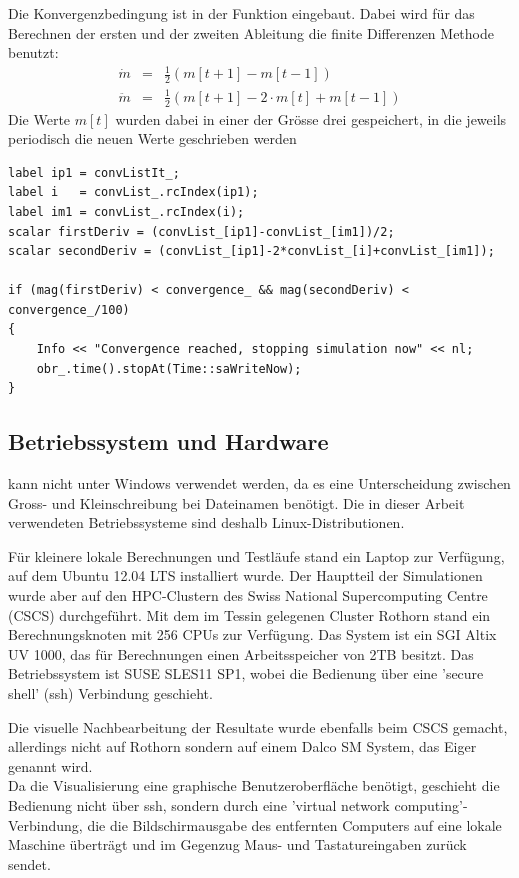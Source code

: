 Die Konvergenzbedingung ist in der Funktion  eingebaut.
Dabei wird für das Berechnen der ersten und der zweiten Ableitung die finite Differenzen Methode benutzt:
%
\begin{eqnarray}
    \label{eq:torqueCalc:fd}
    \dot{m} & = & \frac{1}{2}\left(  m[t+1] - m[t-1] \right) \\
    \ddot{m} & = & \frac{1}{2}\left(  m[t+1] - 2 \cdot m[t] + m[t-1] \right) 
\end{eqnarray}
%
Die Werte $m[t]$ wurden dabei in einer  der Grösse drei gespeichert, in die jeweils periodisch die neuen Werte geschrieben werden
%
\begin{lstlisting}
label ip1 = convListIt_;
label i   = convList_.rcIndex(ip1);
label im1 = convList_.rcIndex(i);
scalar firstDeriv = (convList_[ip1]-convList_[im1])/2;
scalar secondDeriv = (convList_[ip1]-2*convList_[i]+convList_[im1]);

if (mag(firstDeriv) < convergence_ && mag(secondDeriv) < convergence_/100)
{
    Info << "Convergence reached, stopping simulation now" << nl;
    obr_.time().stopAt(Time::saWriteNow);
}
\end{lstlisting}
%
%

%
\subsection{Betriebssystem und Hardware}
\label{Kapitel:Hardware}
\openfoam{} kann nicht unter Windows verwendet werden, da es eine Unterscheidung zwischen Gross- und Kleinschreibung bei Dateinamen benötigt. Die in dieser Arbeit verwendeten Betriebssysteme sind deshalb Linux-Distributionen.

Für kleinere lokale Berechnungen und Testläufe stand ein Laptop zur Verfügung, auf dem Ubuntu 12.04 LTS installiert wurde.
Der Hauptteil der Simulationen wurde aber auf den HPC-Clustern des Swiss National Supercomputing Centre (CSCS) durchgeführt.
Mit dem im Tessin gelegenen Cluster Rothorn stand ein Berechnungsknoten mit 256 CPUs zur Verfügung. Das System ist ein SGI Altix UV 1000, das für Berechnungen einen Arbeitsspeicher von 2TB besitzt.
Das Betriebssystem ist SUSE SLES11 SP1, wobei die Bedienung über eine 'secure shell' (ssh) Verbindung geschieht.

Die visuelle Nachbearbeitung der Resultate wurde ebenfalls beim CSCS gemacht, allerdings nicht auf Rothorn sondern auf einem Dalco SM System, das Eiger genannt wird.\\
Da die Visualisierung eine graphische Benutzeroberfläche benötigt, geschieht die Bedienung nicht über ssh, sondern durch eine 'virtual network computing'-Verbindung, die die Bildschirmausgabe des entfernten Computers auf eine lokale Maschine überträgt und im Gegenzug Maus- und Tastatureingaben zurück sendet.
